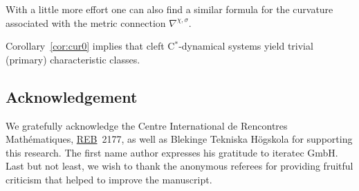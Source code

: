 \documentclass[pdftex]{sigma}
\numberwithin{equation}{section}
\newcommand*{\Star}{$^*$\nobreakdash}
\begin{document}
\begin{Remark} With a little more effort one can also find a similar formula for the curvature associated with the metric connection $\nabla^{\chi,\sigma}$.
\end{Remark}

\begin{Remark}
	Corollary~\ref{cor:cur0} implies that cleft C\Star-dynamical systems yield trivial (primary) characteristic classes.
\end{Remark}

\subsection*{Acknowledgement}

We gratefully acknowledge the Centre International de Rencontres Math\'ematiques, \href{https://conferences.cirm-math.fr/2177}{REB}~2177, as well as Blekinge Tekniska H\"ogskola for supporting this research.
The first name author expresses his gratitude to iteratec GmbH.
Last but not least, we wish to thank the anonymous referees for providing fruitful criticism that helped to improve the manuscript.
\end{document}
